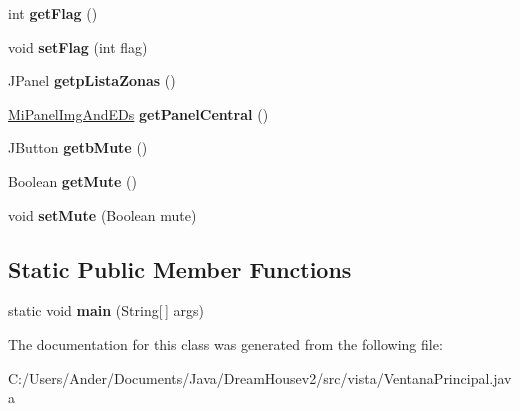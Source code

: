 \begin{DoxyCompactItemize}
int {\bfseries get\+Flag} ()
\item 
\mbox{\label{classvista_1_1_ventana_principal_a355d4483232fb23eb4b2e1c27c7086a9}} 
void {\bfseries set\+Flag} (int flag)
\item 
\mbox{\label{classvista_1_1_ventana_principal_a95bbd92b1f1d270c58f62c6004efa0f3}} 
J\+Panel {\bfseries getp\+Lista\+Zonas} ()
\item 
\mbox{\label{classvista_1_1_ventana_principal_a34c5b655d700623d5a936f252211f80e}} 
\mbox{\hyperlink{classvista_1_1_mi_panel_img_and_e_ds}{Mi\+Panel\+Img\+And\+E\+Ds}} {\bfseries get\+Panel\+Central} ()
\item 
\mbox{\label{classvista_1_1_ventana_principal_aee94264e918d71a71fb001bb26aaa3dc}} 
J\+Button {\bfseries getb\+Mute} ()
\item 
\mbox{\label{classvista_1_1_ventana_principal_a908035b3b52dfaf391f1f6453ecb9565}} 
Boolean {\bfseries get\+Mute} ()
\item 
\mbox{\label{classvista_1_1_ventana_principal_a22637ae07a73f26d3f975a9d46d1acea}} 
void {\bfseries set\+Mute} (Boolean mute)
\end{DoxyCompactItemize}
\subsection*{Static Public Member Functions}
\begin{DoxyCompactItemize}
\item 
\mbox{\label{classvista_1_1_ventana_principal_ae492857ab0e8a1bdc5161177cb1d127e}} 
static void {\bfseries main} (String\mbox{[}$\,$\mbox{]} args)
\end{DoxyCompactItemize}


The documentation for this class was generated from the following file\+:\begin{DoxyCompactItemize}
\item 
C\+:/\+Users/\+Ander/\+Documents/\+Java/\+Dream\+Housev2/src/vista/Ventana\+Principal.\+java\end{DoxyCompactItemize}
